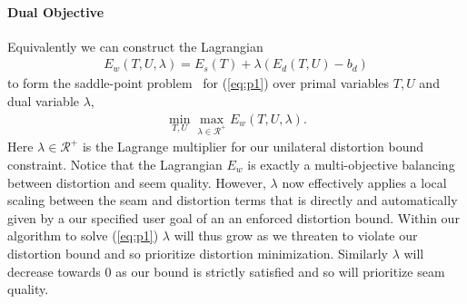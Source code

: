 \paragraph{Dual Objective}

Equivalently we can construct the Lagrangian 
\begin{align}
	E_w(T,U,\lambda) = E_s(T) + \lambda(E_d(T,U) - b_d) 
	\label{eq:L}
\end{align}
to form the saddle-point problem~\cite{} for (\ref{eq:p1}) over primal variables $T,U$ and dual variable $\lambda$,
\begin{align}
	\min_{T,U} \max_{\lambda \in \mathcal{R^+}} E_w(T,U,\lambda).
	\label{eq:p2}
\end{align}
%
Here $\lambda \in \mathcal{R^+}$ is the Lagrange multiplier for our unilateral distortion bound constraint. Notice that the Lagrangian $E_w$ is exactly a multi-objective balancing between distortion and seem quality. However, $\lambda$ now effectively applies a local scaling between the seam and distortion terms that is directly and automatically given by a our specified user goal of an an enforced distortion bound. Within our algorithm to solve (\ref{eq:p1}) $\lambda$ will thus grow as we threaten to violate our distortion bound and so prioritize distortion minimization. Similarly $\lambda$ will decrease towards $0$ as our bound is strictly satisfied and so will prioritize seam quality.






